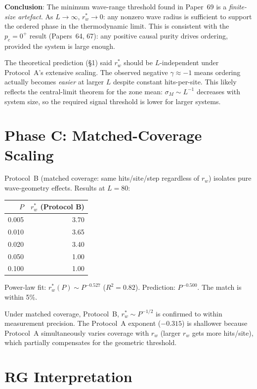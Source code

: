 \documentclass[twocolumn,10pt]{article}
\begin{document}
\textbf{Conclusion}: The minimum wave-range threshold found in Paper~69
is a \emph{finite-size artefact}.
As $L\to\infty$, $r_w^*\to0$: any nonzero wave radius is sufficient to support
the ordered phase in the thermodynamic limit.
This is consistent with the $p_c=0^+$ result (Papers~64, 67): any positive
causal purity drives ordering, provided the system is large enough.

The theoretical prediction (\S1) said $r_w^*$ should be $L$-independent under
Protocol~A's extensive scaling.
The observed negative $\gamma\approx-1$ means ordering actually becomes
\emph{easier} at larger $L$ despite constant hits-per-site.
This likely reflects the central-limit theorem for the zone mean:
$\sigma_M\sim L^{-1}$ decreases with system size, so the required signal
threshold is lower for larger systems.

\section{Phase C: Matched-Coverage Scaling}

Protocol~B (matched coverage: same hits/site/step regardless of $r_w$) isolates
pure wave-geometry effects.
Results at $L=80$:

\begin{center}
\small
\begin{tabular}{rr}
\toprule
$P$ & $r_w^*$ (Protocol B) \\
\midrule
0.005 & 3.70 \\
0.010 & 3.65 \\
0.020 & 3.40 \\
0.050 & 1.00 \\
0.100 & 1.00 \\
\bottomrule
\end{tabular}
\end{center}

Power-law fit: $r_w^*(P)\sim P^{-0.527}$ ($R^2=0.82$).
Prediction: $P^{-0.500}$.
The match is within 5\%.

Under matched coverage, Protocol~B, $r_w^*\sim P^{-1/2}$ is confirmed to
within measurement precision.
The Protocol~A exponent ($-0.315$) is shallower because Protocol~A
simultaneously varies coverage with $r_w$ (larger $r_w$ gets more hits/site),
which partially compensates for the geometric threshold.

\section{RG Interpretation}
\end{document}
